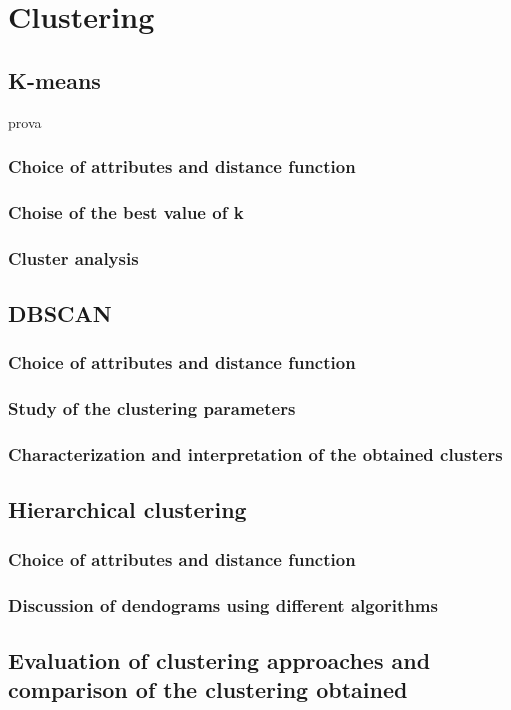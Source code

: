  \chapter{Clustering}

\section{K-means}

prova

\subsection{Choice of attributes and distance function}
\subsection{Choise of the best value of k}
\subsection{Cluster analysis}

\section{DBSCAN}
\subsection{Choice of attributes and distance function}
\subsection{Study of the clustering parameters}
\subsection{Characterization and interpretation of the obtained clusters}

\section{Hierarchical clustering}
\subsection{Choice of attributes and distance function}
\subsection{Discussion of dendograms using different algorithms}

\section{Evaluation of clustering approaches and comparison of the clustering obtained}
